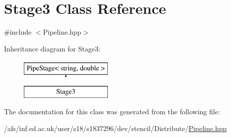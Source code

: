 \hypertarget{classStage3}{\section{Stage3 Class Reference}
\label{classStage3}
}


{\ttfamily \#include $<$Pipeline.\-hpp$>$}

Inheritance diagram for Stage3\-:\begin{figure}[H]
\begin{center}
\leavevmode
\includegraphics[height=2.000000cm]{classStage3}
\end{center}
\end{figure}


The documentation for this class was generated from the following file\-:\begin{DoxyCompactItemize}
\item 
/afs/inf.\-ed.\-ac.\-uk/user/s18/s1837296/dev/stencil/\-Distribute/\hyperlink{Pipeline_8hpp}{Pipeline.\-hpp}\end{DoxyCompactItemize}
